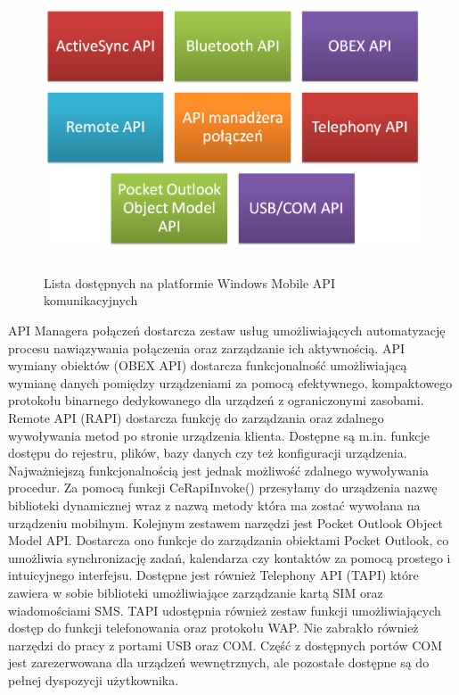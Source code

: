 \begin{figure}[h!]
 \centering \includegraphics[height=85mm]{../images/ch03/wm_comm_api.png}
 \caption{Lista dostępnych na platformie Windows Mobile API komunikacyjnych}
 \label{fig:WMCommunicationAPI}
\end{figure}

API Managera połączeń dostarcza zestaw usług umożliwiających automatyzację
procesu nawiązywania połączenia oraz zarządzanie ich aktywnością. API wymiany
obiektów (OBEX API) dostarcza funkcjonalność umożliwiającą wymianę danych
pomiędzy urządzeniami za pomocą efektywnego, kompaktowego protokołu binarnego
dedykowanego dla urządzeń z ograniczonymi zasobami. Remote API (RAPI) dostarcza
funkcję do zarządzania oraz zdalnego wywoływania metod po stronie urządzenia
klienta. Dostępne są m.in. funkcje dostępu do rejestru, plików, bazy danych czy
też konfiguracji urządzenia. Najważniejszą funkcjonalnością jest jednak możliwość
zdalnego wywoływania procedur. Za pomocą funkcji CeRapiInvoke() przesyłamy do
urządzenia nazwę biblioteki dynamicznej wraz z nazwą metody która ma zostać
wywołana na urządzeniu mobilnym. Kolejnym zestawem narzędzi jest Pocket Outlook
Object Model API. Dostarcza ono funkcje do zarządzania obiektami Pocket Outlook, co
umożliwia synchronizację zadań, kalendarza czy kontaktów za pomocą prostego i
intuicyjnego interfejsu. Dostępne jest również Telephony API (TAPI) które zawiera
w sobie biblioteki umożliwiające zarządzanie kartą SIM oraz wiadomościami SMS.
TAPI udostępnia również zestaw funkcji umożliwiających dostęp do funkcji
telefonowania oraz protokołu WAP. Nie zabrakło również narzędzi do pracy z
portami USB oraz COM. Część z dostępnych portów COM jest zarezerwowana dla
urządzeń wewnętrznych, ale pozostałe dostępne są do pełnej dyspozycji
użytkownika.

